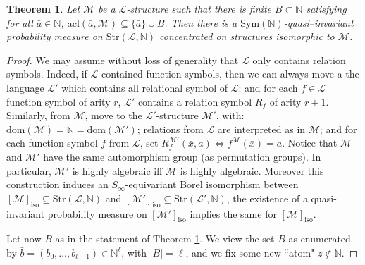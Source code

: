 \documentclass[11pt]{amsart}
\theoremstyle{plain}
\newtheorem{theorem}{Theorem}%
\theoremstyle{definition}
\newcommand{\Ell}{\mathcal{L}}
\newcommand{\N}{\mathbb{N}}
\begin{document}
\begin{theorem}\label{T:main2N} Let $\mathcal{M}$ be a $\mathcal{L}$-structure such that there is finite $B\subset \N$ satisfying for all $\bar{a}\in \N$, $\mathrm{acl}(\bar{a},\mathcal{M})\subseteq \{\bar{a}\}\cup B$. Then there is a  $\mathrm{Sym}(\mathbb{N})$-quasi--invariant probability measure on $\mathrm{Str}(\mathcal{L},\N)$ concentrated on structures isomorphic to $\mathcal{M}$. 
\end{theorem}
\begin{proof}

We may assume without loss of generality that  $\mathcal{L}$ only contains relation symbols. Indeed,  if $\mathcal{L}$ contained function symbols, then we can always move a
the language $\Ell'$ which contains all relational symbol of $\Ell$; and for each $f\in \Ell$ function symbol of arity $r$, $\Ell'$ contains a relation symbol $R_f$ of arity $r+1$. Similarly, from $\mathcal{M}$, move to the $\Ell'$-structure $\mathcal{M}'$, with: $\mathrm{dom}(\mathcal{M})=\N=\mathrm{dom}(\mathcal{M}')$;  
relations from $\mathcal{L}$ are interpreted as in $\mathcal{M}$; and for each function symbol $f$ from $\mathcal{L}$, set $R_f^{\mathcal{M}'}(\bar x, a) \Leftrightarrow f^{\mathcal{M}}(\bar x) =a$.  
Notice that $\mathcal{M}$ and $\mathcal{M}'$ have  the same automorphism group (as permutation groups). In particular, $\mathcal{M}'$ is highly algebraic iff $\mathcal{M}$ is highly algebraic. Moreover this construction induces an $S_{\infty}$-equivariant  Borel isomorphism between  $[\mathcal{M}]_{\mathrm{iso}}\subseteq\mathrm{Str}(\mathcal{L},\N)$ and $[\mathcal{M}']_{\mathrm{iso}}\subseteq\mathrm{Str}(\mathcal{L}',\N)$, the existence of a quasi-invariant probability measure on $[\mathcal{M}']_{\mathrm{iso}}$ implies the same for $[\mathcal{M}]_{\mathrm{iso}}$.


Let now  $B$  as in the statement of Theorem \ref{T:main2N}. We view the set $B$ as enumerated  by $\bar{b}=(b_0,\ldots,b_{l-1})\in \N^{\ell}$, with $|B|=\ell$, and we fix some new ``atom" $z\notin \N$.  %




\end{proof}
\end{document}
